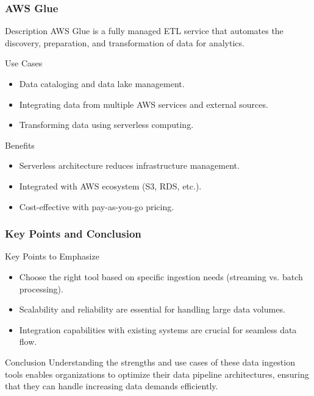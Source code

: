 \documentclass{beamer}
\begin{document}
\begin{frame}[fragile]
    \frametitle{AWS Glue}
    \begin{block}{Description}
        AWS Glue is a fully managed ETL service that automates the discovery, preparation, and transformation of data for analytics.
    \end{block}

    \begin{block}{Use Cases}
        \begin{itemize}
            \item Data cataloging and data lake management.
            \item Integrating data from multiple AWS services and external sources.
            \item Transforming data using serverless computing.
        \end{itemize}
    \end{block}
    
    \begin{block}{Benefits}
        \begin{itemize}
            \item Serverless architecture reduces infrastructure management.
            \item Integrated with AWS ecosystem (S3, RDS, etc.).
            \item Cost-effective with pay-as-you-go pricing.
        \end{itemize}
    \end{block}
\end{frame}

\begin{frame}[fragile]
    \frametitle{Key Points and Conclusion}
    \begin{block}{Key Points to Emphasize}
        \begin{itemize}
            \item Choose the right tool based on specific ingestion needs (streaming vs. batch processing).
            \item Scalability and reliability are essential for handling large data volumes.
            \item Integration capabilities with existing systems are crucial for seamless data flow.
        \end{itemize}
    \end{block}

    \begin{block}{Conclusion}
        Understanding the strengths and use cases of these data ingestion tools enables organizations to optimize their data pipeline architectures, ensuring that they can handle increasing data demands efficiently.
    \end{block}
\end{frame}
\end{document}
